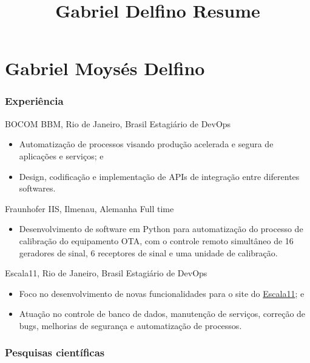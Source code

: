 \documentclass{tccv}
\title{Gabriel Delfino Resume}
\begin{document}
\part{Gabriel Moysés Delfino}


\section{Experiência}

    \begin{eventlist}

            {BOCOM BBM, Rio de Janeiro, Brasil}
            {Estagiário de DevOps}
            \begin{itemize}
                \item Automatização de processos visando produção acelerada e segura de aplicações e serviços; e
                \item Design, codificação e implementação de APIs de integração entre diferentes softwares.
            \end{itemize}

            {Fraunhofer IIS, Ilmenau, Alemanha}
            {Full time}
            \begin{itemize}
                \item Desenvolvimento de software em Python para automatização do processo de calibração do equipamento OTA, com o controle remoto simultâneo de 16 geradores de sinal, 6 receptores de sinal e uma unidade de calibração.
            \end{itemize}
        
            {Escala11, Rio de Janeiro, Brasil}
            {Estagiário de DevOps}
            \begin{itemize}
                \item Foco no desenvolvimento de novas funcionalidades para o site do \href{https://www.escala11.com/}{Escala11}; e
                \item Atuação no controle de banco de dados, manutenção de serviços, correção de bugs, melhorias de segurança e automatização de processos.
            \end{itemize}
    \end{eventlist}

\section{Pesquisas científicas}
\end{document}
